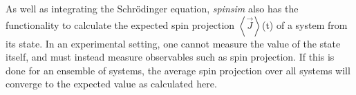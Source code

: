 \documentclass{jors}
\begin{document}




		
		As well as integrating the Schr\"odinger equation, \emph{spinsim} also has the functionality to calculate the expected spin projection \(\left\langle \overrightarrow{J}\right\rangle\)(t) of a system from its state.
		In an experimental setting, one cannot measure the value of the state itself, and must instead measure observables such as spin projection.
		If this is done for an ensemble of systems, the average spin projection over all systems will converge to the expected value as calculated here.
		
\end{document}
